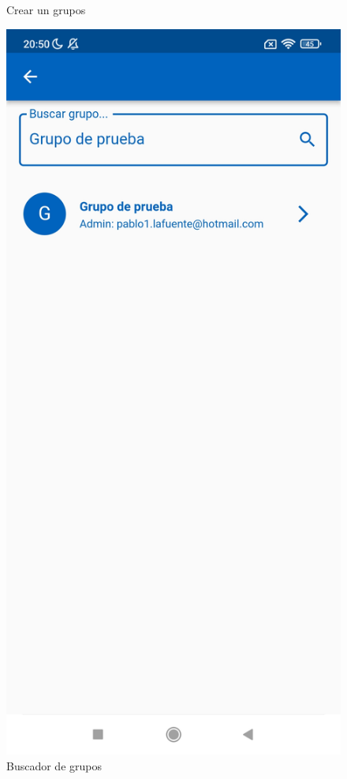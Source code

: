 \documentclass{article}
\begin{document}
\begin{figure}[h]
\begin{minipage}[h]{0.32\textwidth}
        \caption{Crear un grupos}
    \end{minipage}
    \hspace{1cm}
    \begin{minipage}[h]{0.32\textwidth}
        \includegraphics[width=\textwidth]{imagenes/pantallas/grupos/buscar_grupos.jpg}
        \caption{Buscador de grupos}
    \end{minipage}
\end{figure}
\end{document}
